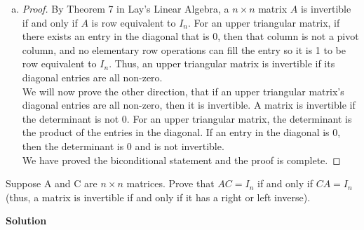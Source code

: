 \documentclass[11pt]{scrartcl}
\theoremstyle{dotlessP}
\theoremstyle{dotlessN}
\begin{document}
\begin{enumerate}[(a)]
\begin{proof}
			\textbf{Scaling}: When multiplying a row by a non-zero constant, all zeroes in the row will remain 0, and thus will maintain the upper triangular property.
			\\

			As we have shown that all elementary row operations to the identity matrix which is an upper triangular matrix preserves the property of an upper triangular matrix, the inverse of an upper triangular matrix $A$, $A^{-1}$, is upper triangular.
		\end{proof}
	\item 
		\begin{proof}
			By Theorem 7 in Lay's Linear Algebra, a $n \times n$ matrix $A$ is invertible if and only if $A$ is row equivalent to $I_n$. For an upper triangular matrix, if there exists an entry in the diagonal that is 0, then that column is not a pivot column, and no elementary row operations can fill the entry so it is 1 to be row equivalent to $I_n$. Thus, an upper triangular matrix is invertible if its diagonal entries are all non-zero.
			\\

			We will now prove the other direction, that if an upper triangular matrix's diagonal entries are all non-zero, then it is invertible. A matrix is invertible if the determinant is not 0. For an upper triangular matrix, the determinant is the product of the entries in the diagonal. If an entry in the diagonal is 0, then the determinant is 0 and is not invertible.
			\\

			We have proved the biconditional statement and the proof is complete.
		\end{proof}
\end{enumerate}
\begin{ques}
	Suppose A and C are $n \times n$ matrices. Prove that $AC = I_n$ if and only if $CA = I_n$ (thus, a matrix is invertible if and only if it has a right or left inverse).
\end{ques}
\textbf{Solution}
\end{document}
